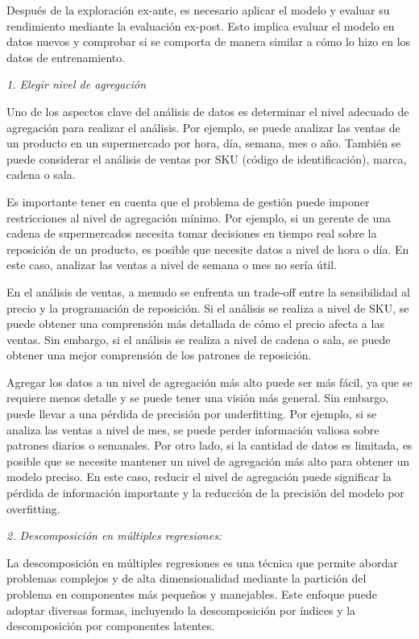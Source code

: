 \documentclass[
]{book}
\begin{document}
Después de la exploración ex-ante, es necesario aplicar el modelo y
evaluar su rendimiento mediante la evaluación ex-post. Esto implica
evaluar el modelo en datos nuevos y comprobar si se comporta de manera
similar a cómo lo hizo en los datos de entrenamiento.

\emph{1. Elegir nivel de agregación}

Uno de los aspectos clave del análisis de datos es determinar el nivel
adecuado de agregación para realizar el análisis. Por ejemplo, se puede
analizar las ventas de un producto en un supermercado por hora, día,
semana, mes o año. También se puede considerar el análisis de ventas por
SKU (código de identificación), marca, cadena o sala.

Es importante tener en cuenta que el problema de gestión puede imponer
restricciones al nivel de agregación mínimo. Por ejemplo, si un gerente
de una cadena de supermercados necesita tomar decisiones en tiempo real
sobre la reposición de un producto, es posible que necesite datos a
nivel de hora o día. En este caso, analizar las ventas a nivel de semana
o mes no sería útil.

En el análisis de ventas, a menudo se enfrenta un trade-off entre la
sensibilidad al precio y la programación de reposición. Si el análisis
se realiza a nivel de SKU, se puede obtener una comprensión más
detallada de cómo el precio afecta a las ventas. Sin embargo, si el
análisis se realiza a nivel de cadena o sala, se puede obtener una mejor
comprensión de los patrones de reposición.

Agregar los datos a un nivel de agregación más alto puede ser más fácil,
ya que se requiere menos detalle y se puede tener una visión más
general. Sin embargo, puede llevar a una pérdida de precisión por
underfitting. Por ejemplo, si se analiza las ventas a nivel de mes, se
puede perder información valiosa sobre patrones diarios o semanales. Por
otro lado, si la cantidad de datos es limitada, es posible que se
necesite mantener un nivel de agregación más alto para obtener un modelo
preciso. En este caso, reducir el nivel de agregación puede significar
la pérdida de información importante y la reducción de la precisión del
modelo por overfitting.

\emph{2. Descomposición en múltiples regresiones:}

La descomposición en múltiples regresiones es una técnica que permite
abordar problemas complejos y de alta dimensionalidad mediante la
partición del problema en componentes más pequeños y manejables. Este
enfoque puede adoptar diversas formas, incluyendo la descomposición por
índices y la descomposición por componentes latentes.
\end{document}
